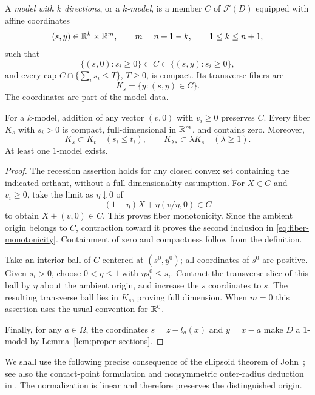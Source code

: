 \begin{definition}\label{def:model}
A \emph{model with $k$ directions}, or a \emph{$k$-model}, is a member
$C$ of $\mathcal F(D)$ equipped with affine coordinates
\[
 (s,y)\in\mathbb R^k\times\mathbb R^m,\qquad m=n+1-k,
 \qquad 1\le k\le n+1,
\]
such that
\[
 \{(s,0):s_i\ge0\}\subset C
 \subset\{(s,y):s_i\ge0\},
\]
and every cap $C\cap\{\sum_i s_i\le T\}$, $T\ge0$, is compact.
Its transverse fibers are
\[
 K_s=\{y:(s,y)\in C\}.
\]
The coordinates are part of the model data.
\end{definition}

\begin{lemma}\label{lem:model-fibers}
For a $k$-model, addition of any vector $(v,0)$ with $v_i\ge0$
preserves $C$.  Every fiber $K_s$ with $s_i>0$ is compact,
full-dimensional in $\mathbb R^m$, and contains zero.  Moreover,
\begin{equation}\label{eq:fiber-monotonicity}
 K_s\subset K_t\quad(s_i\le t_i),
 \qquad K_{\lambda s}\subset\lambda K_s\quad(\lambda\ge1).
\end{equation}
At least one $1$-model exists.
\end{lemma}

\begin{proof}
The recession assertion holds for any closed convex set containing
the indicated orthant, without a full-dimensionality assumption.
For $X\in C$ and $v_i\ge0$, take the limit as $\eta\downarrow0$ of
\[
 (1-\eta)X+\eta(v/\eta,0)\in C
\]
to obtain $X+(v,0)\in C$.  This proves fiber monotonicity.
Since the ambient origin belongs to $C$, contraction toward it
proves the second inclusion in \eqref{eq:fiber-monotonicity}.
Containment of zero and compactness follow from the definition.

Take an interior ball of $C$ centered at $(s^0,y^0)$; all coordinates
of $s^0$ are positive.  Given $s_i>0$, choose $0<\eta\le1$ with
$\eta s^0_i\le s_i$.  Contract the transverse slice of this ball
by $\eta$ about the ambient origin, and increase the $s$ coordinates
to $s$.  The resulting transverse ball lies in $K_s$, proving full
dimension.  When $m=0$ this assertion uses the usual convention for
$\mathbb R^0$.

Finally, for any $a\in\Omega$, the coordinates
$s=z-l_a(x)$ and $y=x-a$ make $D$ a $1$-model by
Lemma~\ref{lem:proper-sections}.
\end{proof}

We shall use the following precise consequence of the ellipsoid
theorem of John~\cite{John1948}; see also the contact-point formulation
and nonsymmetric outer-radius deduction in \cite[Section~0]{Ball1992}.
The normalization is linear and
therefore preserves the distinguished origin.

